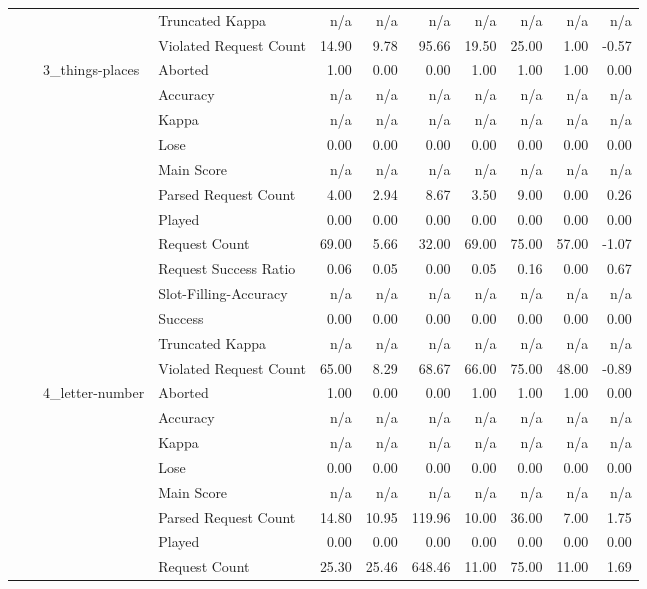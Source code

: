 \begin{tabular}{llllrrrrrrr}
 &  &  & Truncated Kappa & n/a & n/a & n/a & n/a & n/a & n/a & n/a \\
 &  &  & Violated Request Count & 14.90 & 9.78 & 95.66 & 19.50 & 25.00 & 1.00 & -0.57 \\
\cline{3-11}
 &  & \multirow[t]{13}{*}{3_things-places} & Aborted & 1.00 & 0.00 & 0.00 & 1.00 & 1.00 & 1.00 & 0.00 \\
 &  &  & Accuracy & n/a & n/a & n/a & n/a & n/a & n/a & n/a \\
 &  &  & Kappa & n/a & n/a & n/a & n/a & n/a & n/a & n/a \\
 &  &  & Lose & 0.00 & 0.00 & 0.00 & 0.00 & 0.00 & 0.00 & 0.00 \\
 &  &  & Main Score & n/a & n/a & n/a & n/a & n/a & n/a & n/a \\
 &  &  & Parsed Request Count & 4.00 & 2.94 & 8.67 & 3.50 & 9.00 & 0.00 & 0.26 \\
 &  &  & Played & 0.00 & 0.00 & 0.00 & 0.00 & 0.00 & 0.00 & 0.00 \\
 &  &  & Request Count & 69.00 & 5.66 & 32.00 & 69.00 & 75.00 & 57.00 & -1.07 \\
 &  &  & Request Success Ratio & 0.06 & 0.05 & 0.00 & 0.05 & 0.16 & 0.00 & 0.67 \\
 &  &  & Slot-Filling-Accuracy & n/a & n/a & n/a & n/a & n/a & n/a & n/a \\
 &  &  & Success & 0.00 & 0.00 & 0.00 & 0.00 & 0.00 & 0.00 & 0.00 \\
 &  &  & Truncated Kappa & n/a & n/a & n/a & n/a & n/a & n/a & n/a \\
 &  &  & Violated Request Count & 65.00 & 8.29 & 68.67 & 66.00 & 75.00 & 48.00 & -0.89 \\
\cline{3-11}
 &  & \multirow[t]{13}{*}{4_letter-number} & Aborted & 1.00 & 0.00 & 0.00 & 1.00 & 1.00 & 1.00 & 0.00 \\
 &  &  & Accuracy & n/a & n/a & n/a & n/a & n/a & n/a & n/a \\
 &  &  & Kappa & n/a & n/a & n/a & n/a & n/a & n/a & n/a \\
 &  &  & Lose & 0.00 & 0.00 & 0.00 & 0.00 & 0.00 & 0.00 & 0.00 \\
 &  &  & Main Score & n/a & n/a & n/a & n/a & n/a & n/a & n/a \\
 &  &  & Parsed Request Count & 14.80 & 10.95 & 119.96 & 10.00 & 36.00 & 7.00 & 1.75 \\
 &  &  & Played & 0.00 & 0.00 & 0.00 & 0.00 & 0.00 & 0.00 & 0.00 \\
 &  &  & Request Count & 25.30 & 25.46 & 648.46 & 11.00 & 75.00 & 11.00 & 1.69 \\

\end{tabular}
